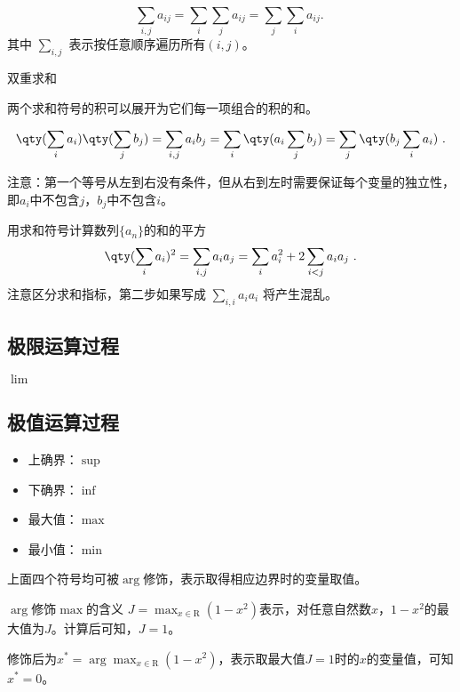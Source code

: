 \begin{equation}
\sum_{i,j} a_{ij}=\sum_{i} \sum_{j} a_{ij} = \sum_{j} \sum_{i} a_{ij}.~
\end{equation}
其中 $\sum\limits_{i,j}$ 表示按任意顺序遍历所有$(i,j)$。

双重求和

两个求和符号的积可以展开为它们每一项组合的积的和。

\begin{equation}
\qty(\sum_i a_i) \qty(\sum_j b_j) = \sum_{i,j} a_i b_j = \sum_i \qty(a_i \sum_j b_j) = \sum_j \qty(b_j \sum_i a_i)~.
\end{equation}

注意：第一个等号从左到右没有条件，但从右到左时需要保证每个变量的独立性，即$a_i$中不包含$j$，$b_j$中不包含$i$。

\begin{example}{用求和符号计算数列$\{a_n\}$的和的平方}
$$\qty(\sum_i a_i)^2 = \sum_{i,j} a_i a_j = \sum_i a_i^2 + 2\sum_{i<j} a_i a_j~.$$
注意区分求和指标，第二步如果写成 $\sum\limits_{i,i} a_i a_i$ 将产生混乱。
\end{example}
\subsection{极限运算过程}

$\lim$

\subsection{极值运算过程}

\begin{itemize}
\item 上确界：$\sup$
\item 下确界：$\inf$
\item 最大值：$\max$
\item 最小值：$\min$
\end{itemize}

上面四个符号均可被$\arg$修饰，表示取得相应边界时的变量取值。

\begin{example}{$\arg$修饰$\max$的含义}
$J=\displaystyle\max_{x\in{\mathrm R}} (1-x^2)$表示，对任意自然数$x$，$1-x^2$的最大值为$J$。计算后可知，$J=1$。

修饰后为$x^*=\displaystyle\arg\max_{x\in{\mathrm R}} (1-x^2)$，表示取最大值$J=1$时的$x$的变量值，可知$x^*=0$。
\end{example}
